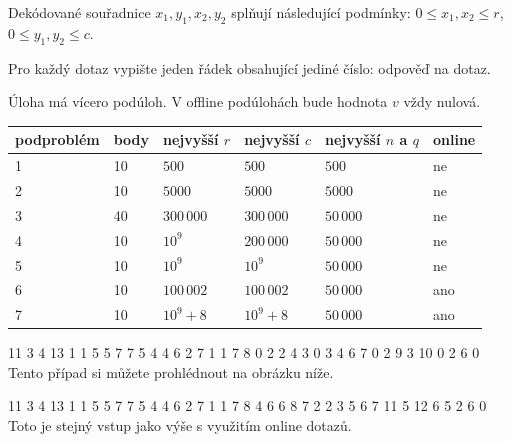 Dekódované souřadnice $x_1, y_1, x_2, y_2$ splňují následující podmínky:
$0 \leq x_1, x_2 \leq r$, $0 \leq y_1, y_2 \leq c$. 


Pro každý dotaz vypište jeden řádek obsahující jediné číslo: odpověď na dotaz.


Úloha má vícero podúloh. V offline podúlohách bude hodnota $v$ vždy nulová.

\bigskip

\begin{center}
\begin{tabular}{|l|l|l|l|l|l|}
\hline
podproblém & body & nejvyšší $r$  & nejvyšší $c$   & nejvyšší $n$ a $q$ & online    \\ \hline
1       & 10     & $500$        & $500$         & $500$     & ne        \\ \hline
2       & 10     & $5000$       & $5000$        & $5000$    & ne        \\ \hline
3       & 40     & $300\,000$   & $300\,000$    & $50\,000$ & ne        \\ \hline
4       & 10     & $10^9$       & $200\,000$    & $50\,000$ & ne        \\ \hline
5       & 10     & $10^9$       & $10^9$        & $50\,000$ & ne        \\ \hline
6       & 10     & $100\,002$   & $100\,002$    & $50\,000$ & ano       \\ \hline
7       & 10     & $10^9 + 8$   & $10^9 + 8$    & $50\,000$ & ano       \\ \hline
\end{tabular}
\end{center}



 11 3 4 13
1 1 5 5
7 7 5 4
4 6 2 7
1 1 7 8 0
2 2 4 3 0
3 4 6 7 0
2 9 3 10 0
2
6
0
\sampleCOMMENT
Tento případ si můžete prohlédnout na obrázku níže.
\sampleEND
{}

 11 3 4 13
1 1 5 5
7 7 5 4
4 6 2 7
1 1 7 8 4
6 6 8 7 2
2 3 5 6 7
11 5 12 6 5
2
6
0
\sampleCOMMENT
Toto je stejný vstup jako výše s využitím online dotazů.
\sampleEND

